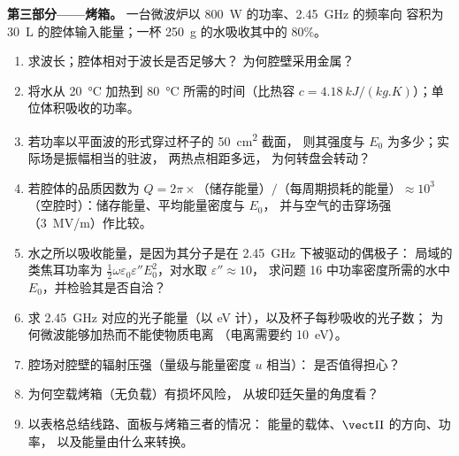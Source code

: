 \begin{problem}
\medskip
\noindent\textbf{第三部分——烤箱。}
一台微波炉以 \qty{800}{W} 的功率、\qty{2.45}{GHz} 的频率向
容积为 \qty{30}{L} 的腔体输入能量；一杯 \qty{250}{g} 的水吸收其中的 $80\%$。
\begin{enumerate}[resume]
  \item 求波长；腔体相对于波长是否足够大？
        为何腔壁采用金属？
  \item 将水从 \qty{20}{\degreeCelsius} 加热到 \qty{80}{\degreeCelsius}
        所需的时间（比热容 $c = \qty{4.18}{kJ/(kg.K)}$）；单位体积吸收的功率。
  \item 若功率以平面波的形式穿过杯子的 \qty{50}{cm^2} 截面，
        则其强度与 $E_0$ 为多少；实际场是振幅相当的驻波，
        两热点相距多远，
        为何转盘会转动？
  \item 若腔体的品质因数为
        $Q = 2\pi\times\text{（储存能量）}/\text{（每周期损耗的能量）}
        \approx 10^3$（空腔时）：储存能量、平均能量密度与 $E_0$，
        并与空气的击穿场强（\qty{3}{MV/m}）作比较。
  \item 水之所以吸收能量，是因为其分子是在 \qty{2.45}{GHz} 下被驱动的偶极子：
        局域的类焦耳功率为 $\tfrac12\omega\varepsilon_0
        \varepsilon''E_0^2$，对水取 $\varepsilon'' \approx 10$，
        求问题 16 中功率密度所需的水中 $E_0$，并检验其是否自洽？
  \item 求 \qty{2.45}{GHz} 对应的光子能量（以 eV 计），以及杯子每秒吸收的光子数；
        为何微波能够加热而不能使物质电离
        （电离需要约 \qty{10}{eV}）。
  \item 腔场对腔壁的辐射压强（量级与能量密度 $u$ 相当）：
        是否值得担心？
  \item 为何空载烤箱（无负载）有损坏风险，
        从坡印廷矢量的角度看？
  \item 以表格总结线路、面板与烤箱三者的情况：
        能量的载体、$\vect\Pi$ 的方向、功率，
        以及能量由什么来转换。
\end{enumerate}
\end{problem}
